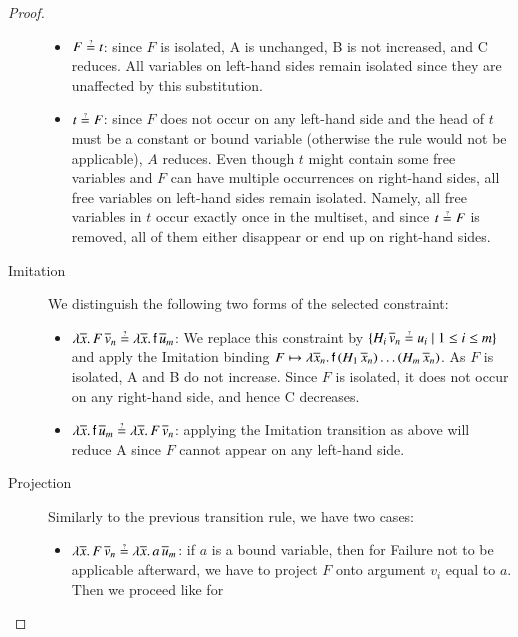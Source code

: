\begin{proof}
\begin{description}
    \begin{itemize}
      \item $F \unif t$: since $F$ is isolated, A is unchanged, B is not
      increased, and C reduces. All variables on left-hand sides remain isolated
      since they are unaffected by this substitution.
      \item $t \unif F $: since $F$ does not occur on any left-hand side and the
      head of $t$ must be a constant or bound variable (otherwise the rule would
      not be applicable), $A$ reduces. Even though $t$ might contain some free
      variables and $F$ can have multiple occurrences on right-hand sides, all
      free variables on left-hand sides remain isolated. Namely, all free variables
      in $t$ occur exactly once in the multiset, and since $t \unif F$ is
      removed, all of them either disappear or end up on right-hand sides.
    \end{itemize}
    \item[Imitation] We distinguish the following two forms of the selected constraint:
    \begin{itemize}
      \item $\lambda \overline{x}. \, F \, \overline{v}_n \unif \lambda \overline{x}. \,
      \cst{f} \, \overline{u}_m$: 
      We replace this constraint by 
      $\{H_i \, \overline{v}_n \unif u_i \mid 1\le i\le m\}$
      and apply the \textsf{Imitation} binding
      $F \mapsto \lambda \overline{x}_n.\, \mathsf{f} \, (H_1 \, \overline{x}_n) \allowbreak
      \ldots (H_m \, \overline{x}_n)$.
      As $F$ is isolated, A and B do not increase.
      Since $F$ is isolated, it does not occur on any right-hand side, and hence C decreases.
      \item $\lambda \overline{x}. \, \cst{f} \, \overline{u}_m \unif \lambda \overline{x}. \, F \, \overline{v}_n $:
      applying the \textsf{Imitation} transition 
      as above will reduce A since $F$ cannot appear on any
      left-hand side.
    \end{itemize}
    \item[Projection] Similarly to the previous transition rule, we have two cases:
      \begin{itemize}
        \item$\lambda \overline{x}. \, F \, \overline{v}_n \unif \lambda
        \overline{x}. \, a \, \overline{u}_m$: if $a$ is a bound variable,
        then for \textsf{Failure} not to be applicable afterward, we have to
        project $F$ onto argument $v_i$ equal to $a$. Then we proceed like for

\end{itemize}
\end{description}
\end{proof}
